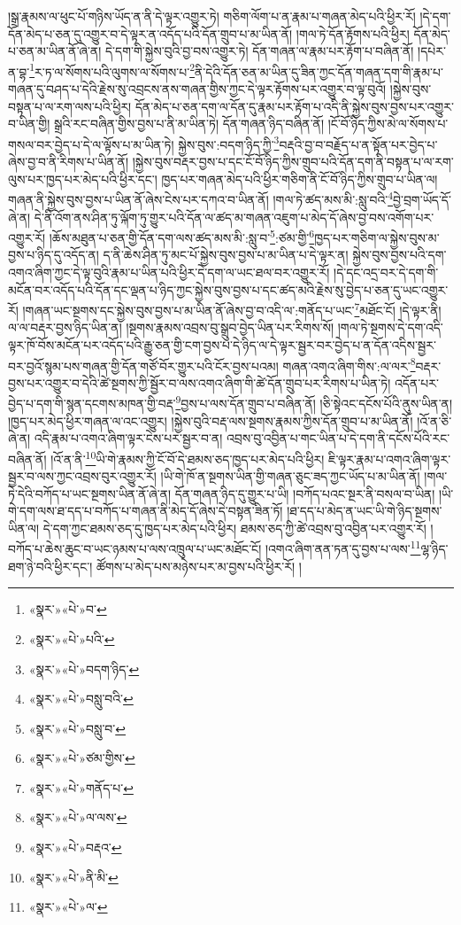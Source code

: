 །སྒྲ་རྣམས་ལ་ཕུང་པོ་གཉིས་ཡོད་ན་ནི་དེ་ལྟར་འགྱུར་ཏེ། གཅིག་ལོག་པ་ན་རྣམ་པ་གཞན་མེད་པའི་ཕྱིར་རོ། །དེ་དག་དོན་མེད་པ་ཅན་དུ་འགྱུར་བ་དེ་ལྟར་ན་འདོད་པའི་དོན་གྲུབ་པ་མ་ཡིན་ནོ། །གལ་ཏེ་དོན་རྟོགས་པའི་ཕྱིར། དོན་མེད་པ་ཅན་མ་ཡིན་ནོ་ཞེ་ན། དེ་དག་གི་སྐྱེས་བུའི་བྱ་བས་འགྱུར་ཏེ། དོན་གཞན་ལ་རྣམ་པར་རྟོག་པ་བཞིན་ནོ། །དཔེར་ན་བྷ་\footnote{«སྣར་»«པེ་»བ་}ར་ཏ་ལ་སོགས་པའི་ལུགས་ལ་སོགས་པ་\footnote{«སྣར་»«པེ་»པའི་}ནི་དེའི་དོན་ཅན་མ་ཡིན་དུ་ཟིན་ཀྱང་དོན་གཞན་དག་གི་རྣམ་པ་གཞན་དུ་བཤད་པ་དེའི་རྗེས་སུ་འབྲངས་ནས་གཞན་གྱིས་ཀྱང་དེ་ལྟར་རྟོགས་པར་འགྱུར་བ་ལྟ་བུའོ། །སྐྱེས་བུས་བསྟན་པ་ལ་རག་ལས་པའི་ཕྱིར། དོན་མེད་པ་ཅན་དག་ལ་དོན་དུ་རྣམ་པར་རྟོག་པ་འདི་ནི་སྐྱེས་བུས་བྱས་པར་འགྱུར་བ་ཡིན་གྱི། སྒྲའི་རང་བཞིན་གྱིས་བྱས་པ་ནི་མ་ཡིན་ཏེ། དོན་གཞན་ཉིད་བཞིན་ནོ། །ངོ་བོ་ཉིད་ཀྱིས་མེ་ལ་སོགས་པ་གསལ་བར་བྱེད་པ་དེ་ལ་ལྟོས་པ་མ་ཡིན་ཏེ། སྐྱེས་བུས་:བདག་ཉིད་ཀྱི་\footnote{«སྣར་»«པེ་»བདག་ཉིད་}བརྡའི་བྱ་བ་བརྗོད་པ་ན་སྟོན་པར་བྱེད་པ་ཞེས་བྱ་བ་ནི་རིགས་པ་ཡིན་ནོ། །སྐྱེས་བུས་བརྡར་བྱས་པ་དང་ངོ་བོ་ཉིད་ཀྱིས་གྲུབ་པའི་དོན་དག་ནི་བསྟན་པ་ལ་རག་ལུས་པར་ཁྱད་པར་མེད་པའི་ཕྱིར་དང་། ཁྱད་པར་གཞན་མེད་པའི་ཕྱིར་གཅིག་ནི་ངོ་བོ་ཉིད་ཀྱིས་གྲུབ་པ་ཡིན་ལ། གཞན་ནི་སྐྱེས་བུས་བྱས་པ་ཡིན་ནོ་ཞེས་ངེས་པར་དཀའ་བ་ཡིན་ནོ། །གལ་ཏེ་ཚད་མས་མི་:སླུ་བའི་\footnote{«སྣར་»«པེ་»བསླུ་བའི་}བྱེ་བྲག་ཡོད་དོ་ཞེ་ན། དེ་ནི་འོག་ནས་ཤིན་ཏུ་ལྐོག་ཏུ་གྱུར་པའི་དོན་ལ་ཚད་མ་གཞན་འཇུག་པ་མེད་དོ་ཞེས་བྱ་བས་འགོག་པར་འགྱུར་རོ། །ཆོས་མཐུན་པ་ཅན་གྱི་དོན་དག་ལས་ཚད་མས་མི་:སླུ་བ་\footnote{«སྣར་»«པེ་»བསླུ་བ་}:ཙམ་གྱི་\footnote{«སྣར་»«པེ་»ཙམ་གྱིས་}ཁྱད་པར་གཅིག་ལ་སྐྱེས་བུས་མ་བྱས་པ་ཉིད་དུ་འདོད་ན། ད་ནི་ཆེས་ཤིན་ཏུ་མང་པོ་སྐྱེས་བུས་བྱས་པ་མ་ཡིན་པ་དེ་ལྟར་ན། སྐྱེས་བུས་བྱས་པའི་དག་འགའ་ཞིག་ཀྱང་དེ་ལྟ་བུའི་རྣམ་པ་ཡིན་པའི་ཕྱིར་དེ་དག་ལ་ཡང་ཐལ་བར་འགྱུར་རོ། །དེ་དང་འདྲ་བར་དེ་དག་གི་མངོན་བར་འདོད་པའི་དོན་དང་ལྡན་པ་ཉིད་ཀྱང་སྐྱེས་བུས་བྱས་པ་དང་ཚད་མའི་རྗེས་སུ་བྱེད་པ་ཅན་དུ་ཡང་འགྱུར་རོ། །གཞན་ཡང་སྔགས་དང་སྐྱེས་བུས་བྱས་པ་མ་ཡིན་ནོ་ཞེས་བྱ་བ་འདི་ལ་:གནོད་པ་ཡང་\footnote{«སྣར་»«པེ་»གནོད་པ་}མཐོང་ངོ། །དེ་ལྟར་ནི། ལ་ལ་བརྡར་བྱས་ཉིད་ཡིན་ན། །སྔགས་རྣམས་འབྲས་བུ་སྒྲུབ་བྱེད་ཡིན་པར་རིགས་སོ། །གལ་ཏེ་སྔགས་དེ་དག་འདི་ལྟར་ཁོ་བོས་མངོན་པར་འདོད་པའི་རྒྱུ་ཅན་གྱི་ངག་བྱས་པ་དེ་ཉིད་ལ་དེ་ལྟར་སྦྱར་བར་བྱེད་པ་ན་དོན་འདིས་སྦྱར་བར་བྱའོ་སྙམ་པས་གཞན་གྱི་དོན་གཙོ་བོར་གྱུར་པའི་ངོར་བྱས་པའམ། གཞན་འགའ་ཞིག་གིས་:ལ་ལར་\footnote{«སྣར་»«པེ་»ལ་ལས་}བརྡར་བྱས་པར་འགྱུར་བ་དེའི་ཚེ་སྔགས་ཀྱི་སྦྱོར་བ་ལས་འགའ་ཞིག་གི་ཚེ་དོན་གྲུབ་པར་རིགས་པ་ཡིན་ཏེ། འདོན་པར་བྱེད་པ་དག་གི་སྙན་དངགས་མཁན་གྱི་བརྡ་\footnote{«སྣར་»«པེ་»བརྡའ་}བྱས་པ་ལས་དོན་གྲུབ་པ་བཞིན་ནོ། །ཅི་སྟེའང་དངོས་པོའི་ནུས་ཡིན་ན། །ཁྱད་པར་མེད་ཕྱིར་གཞན་ལ་འང་འགྱུར། །སྐྱེས་བུའི་བརྡ་ལས་སྔགས་རྣམས་ཀྱིས་དོན་གྲུབ་པ་མ་ཡིན་ནོ། །འོ་ན་ཅི་ཞེ་ན། འདི་རྣམ་པ་འགའ་ཞིག་ལྟར་ངེས་པར་སྦྱར་བ་ན། འབྲས་བུ་འབྱིན་པ་གང་ཡིན་པ་དེ་དག་ནི་དངོས་པོའི་རང་བཞིན་ནོ། །འོ་ན་ནི་\footnote{«སྣར་»«པེ་»ནི་མི་}ཡི་གེ་རྣམས་ཀྱི་ངོ་བོ་དེ་ཐམས་ཅད་ཁྱད་པར་མེད་པའི་ཕྱིར། ཇི་ལྟར་རྣམ་པ་འགའ་ཞིག་ལྟར་སྦྱར་བ་ལས་ཀྱང་འབྲས་བུར་འགྱུར་རོ། །ཡི་གེ་ཁོ་ན་སྔགས་ཡིན་གྱི་གཞན་ཅུང་ཟད་ཀྱང་ཡོད་པ་མ་ཡིན་ནོ། །གལ་ཏེ་དེའི་བཀོད་པ་ཡང་སྔགས་ཡིན་ནོ་ཞེ་ན། དོན་གཞན་ཉིད་དུ་གྱུར་པ་ཡི། །བཀོད་པའང་སྔར་ནི་བསལ་བ་ཡིན། །ཡི་གེ་དག་ལས་ཐ་དད་པ་བཀོད་པ་གཞན་ནི་མེད་དོ་ཞེས་དེ་བསྟན་ཟིན་ཏོ། །ཐ་དད་པ་མེད་ན་ཡང་ཡི་གེ་ཉིད་སྔགས་ཡིན་ལ། དེ་དག་ཀྱང་ཐམས་ཅད་དུ་ཁྱད་པར་མེད་པའི་ཕྱིར། ཐམས་ཅད་ཀྱི་ཚེ་འབྲས་བུ་འབྱིན་པར་འགྱུར་རོ། །བཀོད་པ་ཆེས་ཆུང་བ་ཡང་ཉམས་པ་ལས་འཁྲུལ་པ་ཡང་མཐོང་ངོ། །འགའ་ཞིག་ནན་ཏན་དུ་བྱས་པ་ལས་\footnote{«སྣར་»«པེ་»ལ་}ལྷ་ཉིད་ཐག་ཉེ་བའི་ཕྱིར་དང་། ཚོགས་པ་མེད་པས་མཉེས་པར་མ་བྱས་པའི་ཕྱིར་རོ། །
